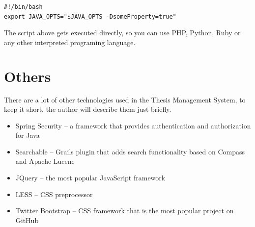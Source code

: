 \begin{verbatim}
#!/bin/bash
export JAVA_OPTS="$JAVA_OPTS -DsomeProperty=true"
\end{verbatim}

The script above gets executed directly, so you can use PHP, Python, Ruby or any other interpreted programing language.

\section{Others}

There are a lot of other technologies used in the Thesis Management System, to keep it short, the author will describe them just briefly.

\begin{itemize}
    \item Spring Security -- a framework that provides authentication and authorization for Java
    \item Searchable -- Grails plugin that adds search functionality based on Compass and Apache Lucene\cite{searchable-documentation}
    \item JQuery -- the most popular JavaScript framework
    \item LESS -- CSS preprocessor
    \item Twitter Bootstrap -- CSS framework that is the most popular project on GitHub
\end{itemize}

